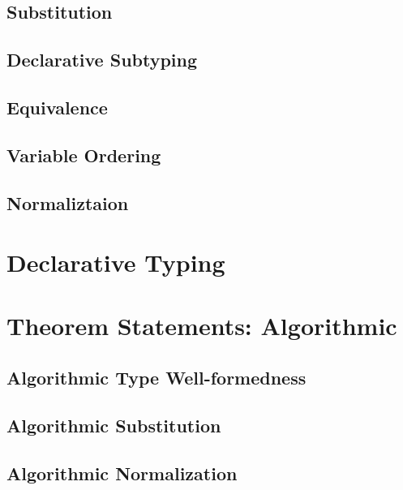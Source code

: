 \documentclass[acmsmall,natbib=false,review,anonymous]{acmart}
\newcommand{\genDir}{_gen}
\begin{document}
\subsection{Substitution}


\subsection{Declarative Subtyping}


\subsection{Equivalence}
\label{sec:decl-equiv-statements}


\subsection{Variable Ordering}


\subsection{Normaliztaion}


\section{Declarative Typing}


\section{Theorem Statements: Algorithmic}

\subsection{Algorithmic Type Well-formedness}


\subsection{Algorithmic Substitution}


\subsection{Algorithmic Normalization}

\end{document}
